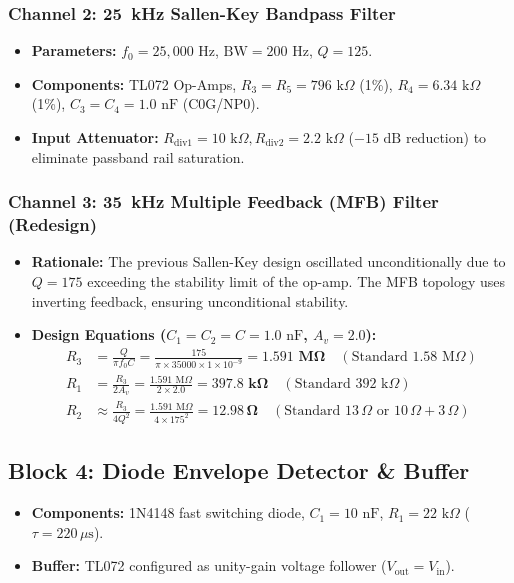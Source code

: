 \documentclass[11pt,a4paper]{article}
\begin{document}
\subsubsection{Channel 2: 25~kHz Sallen-Key Bandpass Filter}
\begin{itemize}[leftmargin=*]
    \item \textbf{Parameters:} $f_0 = 25,000\text{ Hz}$, $\text{BW} = 200\text{ Hz}$, $Q = 125$.
    \item \textbf{Components:} TL072 Op-Amps, $R_3 = R_5 = 796\text{ k}\Omega$ (1\%), $R_4 = 6.34\text{ k}\Omega$ (1\%), $C_3 = C_4 = 1.0\text{ nF}$ (C0G/NP0).
    \item \textbf{Input Attenuator:} $R_{\text{div1}} = 10\text{ k}\Omega, R_{\text{div2}} = 2.2\text{ k}\Omega$ ($-15\text{ dB}$ reduction) to eliminate passband rail saturation.
\end{itemize}

\subsubsection{Channel 3: 35~kHz Multiple Feedback (MFB) Filter (Redesign)}
\begin{itemize}[leftmargin=*]
    \item \textbf{Rationale:} The previous Sallen-Key design oscillated unconditionally due to $Q=175$ exceeding the stability limit of the op-amp. The MFB topology uses inverting feedback, ensuring unconditional stability.
    \item \textbf{Design Equations ($C_1 = C_2 = C = 1.0\text{ nF}$, $A_v = 2.0$):}
    \begin{align*}
        R_3 &= \frac{Q}{\pi f_0 C} = \frac{175}{\pi \times 35000 \times 1\times 10^{-9}} = \mathbf{1.591\text{ M}\Omega} \quad (\text{Standard } 1.58\text{ M}\Omega)\\
        R_1 &= \frac{R_3}{2 A_v} = \frac{1.591\text{ M}\Omega}{2 \times 2.0} = \mathbf{397.8\text{ k}\Omega} \quad (\text{Standard } 392\text{ k}\Omega)\\
        R_2 &\approx \frac{R_3}{4 Q^2} = \frac{1.591\text{ M}\Omega}{4 \times 175^2} = \mathbf{12.98\,\Omega} \quad (\text{Standard } 13\,\Omega \text{ or } 10\,\Omega + 3\,\Omega)
    \end{align*}
\end{itemize}

\subsection{Block 4: Diode Envelope Detector \& Buffer}
\begin{itemize}[leftmargin=*]
    \item \textbf{Components:} 1N4148 fast switching diode, $C_1 = 10\text{ nF}$, $R_1 = 22\text{ k}\Omega$ ($\tau = 220\,\mu\text{s}$).
    \item \textbf{Buffer:} TL072 configured as unity-gain voltage follower ($V_{\text{out}} = V_{\text{in}}$).
\end{itemize}
\end{document}
